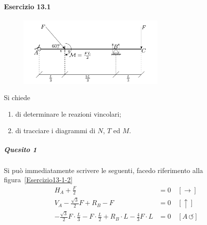 \paragraph{Esercizio 13.1}
\renewcommand{\thefigure}{13.1~-~1}
\begin{figure}[ht]
\centering
\includegraphics[width=0.65\textwidth]{Immagini/Parte_13/Esercizio13_1/figura13_1_1.pdf}
\caption{}
\label{Esercizio13-1-1}
\end{figure}
Si chiede 
\begin{enumerate}
\item di determinare le reazioni vincolari;
\item di tracciare i diagrammi di $N$, $T$ ed $M$.
\end{enumerate}
\subparagraph{Quesito 1}
Si può immediatamente scrivere le seguenti, facedo riferimento alla figura~\ref{Esercizio13-1-2}
\begin{align*}
H_{A} + \frac{F}{2} &= 0 \quad [\rightarrow] \\ 
V_{A} - \frac{ \sqrt{3} }{2}F + R_{B} - F &= 0 \quad [\uparrow] \\
- \frac{ \sqrt{3} }{2}F \cdot \frac{L}{3} - F \cdot \frac{L}{2} + R_{B} \cdot L - \frac{4}{3} F \cdot L   &= 0 \quad [A\,\circlearrowleft]
\end{align*}
